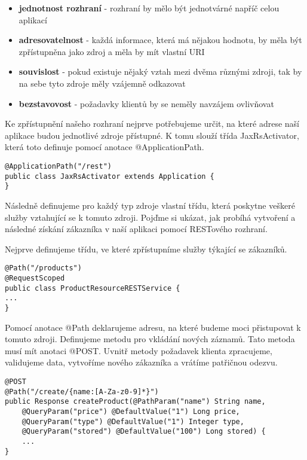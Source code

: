 \documentclass[122pt,oneside]{fithesis}
\begin{document}
\begin{itemize}
  \item {\bf jednotnost rozhraní} - rozhraní by mělo být jednotvárné napříč celou aplikací
  \item {\bf adresovatelnost} - každá informace, která má nějakou hodnotu, by měla být zpřístupněna jako zdroj a měla by mít vlastní URI
  \item {\bf souvislost} - pokud existuje nějaký vztah mezi dvěma různými zdroji, tak by na sebe tyto zdroje měly vzájemně odkazovat
  \item {\bf bezstavovost} - požadavky klientů by se neměly navzájem ovlivňovat 
\end{itemize}

Ke zpřístupnění našeho rozhraní nejprve potřebujeme určit, na které adrese naší aplikace budou jednotlivé zdroje přístupné. K tomu slouží třída JaxRsActivator, která toto definuje pomocí anotace @ApplicationPath.

\begin{lstlisting}
@ApplicationPath("/rest")
public class JaxRsActivator extends Application {
}
\end{lstlisting}

Následně definujeme pro každý typ zdroje vlastní třídu, která poskytne veškeré služby vztahující se k tomuto zdroji. Pojďme si ukázat, jak probíhá vytvoření a následné získání zákazníka v naší aplikaci pomocí RESTového rozhraní.

Nejprve definujeme třídu, ve které zpřístupníme služby týkající se zákazníků.

\begin{lstlisting}
@Path("/products")
@RequestScoped
public class ProductResourceRESTService {
...
}
\end{lstlisting}

Pomocí anotace @Path deklarujeme adresu, na které budeme moci přistupovat k tomuto zdroji. Definujeme metodu pro vkládání nových záznamů. Tato metoda musí mít anotaci @POST. Uvnitř metody požadavek klienta zpracujeme, validujeme data, vytvoříme nového zákazníka a vrátíme patřičnou odezvu.

\begin{lstlisting}
@POST
@Path("/create/{name:[A-Za-z0-9]*}")
public Response createProduct(@PathParam("name") String name,
	@QueryParam("price") @DefaultValue("1") Long price,
	@QueryParam("type") @DefaultValue("1") Integer type,
	@QueryParam("stored") @DefaultValue("100") Long stored) {
	...
}
\end{lstlisting}
\end{document}

